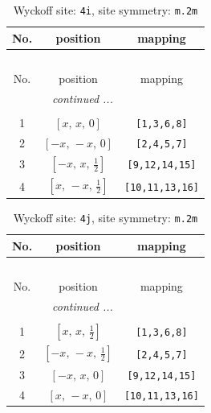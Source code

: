 \documentclass[fleqn,8pt]{jsarticle}
\begin{document}
\renewcommand{\arraystretch}{1.2}
\begin{longtable}{ccc}
\caption{Wyckoff site: {\tt 4i}, site symmetry: {\tt m.2m}}
 \\
 \hline \hline
No. & position & mapping \\ \hline \endfirsthead

\multicolumn{2}{l}{\tablename\ \thetable{}} \\
 \hline \hline
No. & position & mapping \\ \hline \endhead

 \hline \hline
\multicolumn{2}{r}{\footnotesize\it continued ...} \\ \endfoot

 \hline \hline
\multicolumn{2}{r}{} \\ \endlastfoot

1 & $\left[ x,\, x,\, 0 \right]$ & {\tt [1,3,6,8]} \\ \hline
2 & $\left[ - x,\, - x,\, 0 \right]$ & {\tt [2,4,5,7]} \\ \hline
3 & $\left[ - x,\, x,\, \frac{1}{2} \right]$ & {\tt [9,12,14,15]} \\ \hline
4 & $\left[ x,\, - x,\, \frac{1}{2} \right]$ & {\tt [10,11,13,16]} \\
\end{longtable}
\renewcommand{\arraystretch}{1.2}
\begin{longtable}{ccc}
\caption{Wyckoff site: {\tt 4j}, site symmetry: {\tt m.2m}}
 \\
 \hline \hline
No. & position & mapping \\ \hline \endfirsthead

\multicolumn{2}{l}{\tablename\ \thetable{}} \\
 \hline \hline
No. & position & mapping \\ \hline \endhead

 \hline \hline
\multicolumn{2}{r}{\footnotesize\it continued ...} \\ \endfoot

 \hline \hline
\multicolumn{2}{r}{} \\ \endlastfoot

1 & $\left[ x,\, x,\, \frac{1}{2} \right]$ & {\tt [1,3,6,8]} \\ \hline
2 & $\left[ - x,\, - x,\, \frac{1}{2} \right]$ & {\tt [2,4,5,7]} \\ \hline
3 & $\left[ - x,\, x,\, 0 \right]$ & {\tt [9,12,14,15]} \\ \hline
4 & $\left[ x,\, - x,\, 0 \right]$ & {\tt [10,11,13,16]} \\
\end{longtable}
\end{document}

